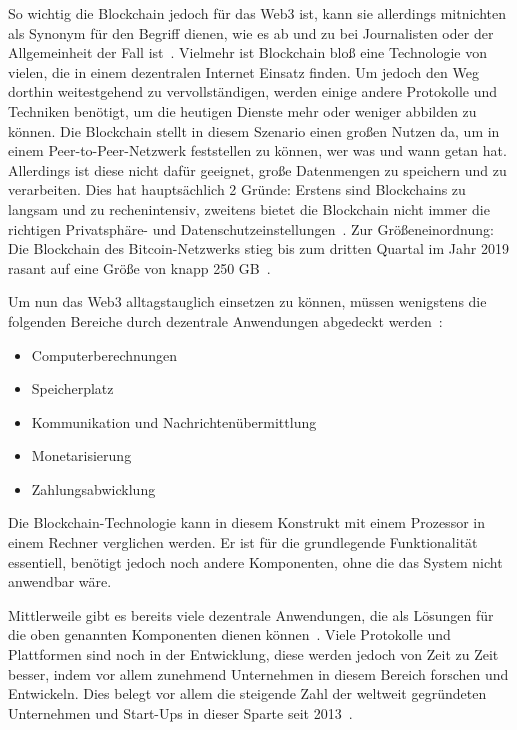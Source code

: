 \smallskip

So wichtig die Blockchain jedoch für das Web3 ist, kann sie allerdings mitnichten als Synonym für den Begriff dienen, wie es ab und zu bei Journalisten oder der Allgemeinheit der Fall ist~\cite[S. 27]{Voshmgir.2019}. Vielmehr ist Blockchain bloß eine Technologie von vielen, die in einem dezentralen Internet Einsatz finden.
Um jedoch den Weg dorthin weitestgehend zu vervollständigen, werden einige andere Protokolle und Techniken benötigt, um die heutigen Dienste mehr oder weniger abbilden zu können. Die Blockchain stellt in diesem Szenario einen großen Nutzen da, um in einem Peer-to-Peer-Netzwerk feststellen zu können, wer was und wann getan hat. Allerdings ist diese nicht dafür geeignet, große Datenmengen zu speichern und zu verarbeiten. Dies hat hauptsächlich 2 Gründe: Erstens sind Blockchains zu langsam und zu rechenintensiv, zweitens bietet die Blockchain nicht immer die richtigen Privatsphäre- und Datenschutzeinstellungen~\cite[S. 27]{Voshmgir.2019}. Zur Größeneinordnung: Die Blockchain des Bitcoin-Netzwerks stieg bis zum dritten Quartal im Jahr 2019 rasant auf eine Größe von knapp 250 GB~\cite{Blockchain.2019}. 

\smallskip

Um nun das Web3 alltagstauglich einsetzen zu können, müssen wenigstens die folgenden Bereiche durch dezentrale Anwendungen abgedeckt werden~\cite[S. 27]{Voshmgir.2019}:

\begin{itemize}
	\item Computerberechnungen
	\item Speicherplatz
	\item Kommunikation und Nachrichtenübermittlung
	\item Monetarisierung
	\item Zahlungsabwicklung
\end{itemize}

Die Blockchain-Technologie kann in diesem Konstrukt mit einem Prozessor in einem Rechner verglichen werden. Er ist für die grundlegende Funktionalität essentiell, benötigt jedoch noch andere Komponenten, ohne die das System nicht anwendbar wäre. 

Mittlerweile gibt es bereits viele dezentrale Anwendungen, die als Lösungen für die oben genannten Komponenten dienen können~\cite{gdamdam.2019}. Viele Protokolle und Plattformen sind noch in der Entwicklung, diese werden jedoch von Zeit zu Zeit besser, indem vor allem zunehmend Unternehmen in diesem Bereich forschen und Entwickeln. Dies belegt vor allem die steigende Zahl der weltweit gegründeten Unternehmen und Start-Ups in dieser Sparte seit 2013~\cite{IPlyticsGmbH.2019}. 

